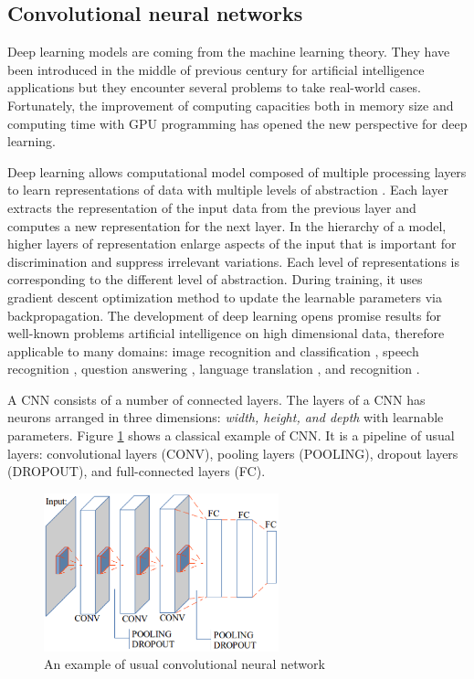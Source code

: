 \documentclass{article} %
\begin{document}
\begin{multicols}{2}
\section{Convolutional neural networks}
Deep learning models are coming from the machine learning theory. They have been introduced in the middle of previous century for artificial intelligence applications but they encounter several problems to take real-world cases. Fortunately, the improvement of computing capacities both in memory size and computing time with GPU programming has opened the new perspective for deep learning. 

Deep learning allows computational model composed of multiple processing layers to learn representations of data with multiple levels of abstraction \cite{lecun2015deep}. Each layer extracts the representation of the input data from the previous layer and computes a new representation for the next layer. In the hierarchy of a model, higher layers of representation enlarge aspects of the input that is important for discrimination and suppress irrelevant variations. Each level of representations is corresponding to the different level of abstraction. During training, it uses gradient descent optimization method to update the learnable parameters via backpropagation. The development of deep learning opens promise results for well-known problems artificial intelligence on high dimensional data, therefore applicable to many domains: image recognition and classification \cite{krizhevsky2012imagenet,ciregan2012multi,szegedy2015going}, speech recognition \cite{mikolov2011strategies,hinton2012deep,sainath2013deep}, question answering \cite{bordes2014question}, language translation \cite{sutskever2014sequence, jean2014using}, and recognition \cite{li2015convolutional, tompson2014joint}.

A CNN consists of a number of connected layers. The layers of a CNN has neurons arranged in three dimensions: \textit{width, height, and depth} with learnable parameters. Figure \ref{figconvarc} shows a classical example of CNN. It is a pipeline of usual layers: convolutional layers (CONV), pooling layers (POOLING), dropout layers (DROPOUT), and full-connected layers (FC).

\begin{figure}[H]
	\centerline{\includegraphics[height=1.8in]{images/convarc.eps}}
	\caption{\footnotesize{An example of usual convolutional neural network}}
	\label{figconvarc}
\end{figure}


\end{multicols}
\end{document}
